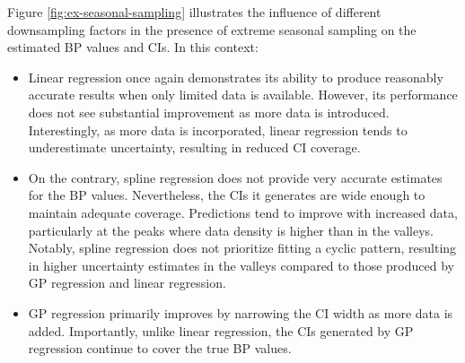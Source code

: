 Figure \ref{fig:ex-seasonal-sampling} illustrates the influence of different
downsampling factors in the presence of extreme seasonal sampling on the estimated
BP values and CIs. In this context:
\begin{itemize}
    \item Linear regression once again demonstrates its ability to produce
    reasonably accurate results when only limited data is available.
    However, its performance does not see substantial improvement as more data is introduced.
    Interestingly, as more data is incorporated, linear regression tends to underestimate uncertainty,
    resulting in reduced CI coverage.
    \item On the contrary, spline regression does not provide very accurate estimates
    for the BP values. Nevertheless, the CIs it generates are wide enough to maintain
    adequate coverage.
    Predictions tend to improve with increased data, particularly at the peaks
    where data density is higher than in the valleys.
    Notably, spline regression does not prioritize fitting a cyclic pattern,
    resulting in higher uncertainty estimates in the valleys compared to those
    produced by GP regression and linear regression.
    \item GP regression primarily improves by narrowing the CI width as more data is added.
    Importantly, unlike linear regression, the CIs generated by GP regression continue
    to cover the true BP values.
\end{itemize}


